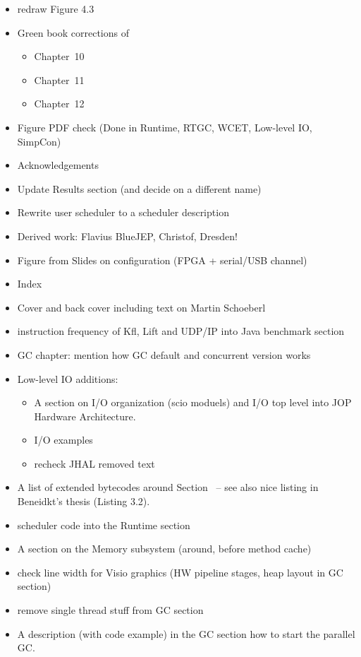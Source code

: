\begin{itemize}
    \item redraw Figure 4.3
  \item Green book corrections of
  \begin{itemize}
    \item Chapter~10
    \item Chapter~11
    \item Chapter~12
  \end{itemize}
    \item Figure PDF check (Done in Runtime, RTGC, WCET,
        Low-level IO, SimpCon)

    \item Acknowledgements
    \item Update Results section (and decide on a different name)
    \item Rewrite user scheduler to a scheduler description
    \item Derived work: Flavius BlueJEP, Christof, Dresden!
    \item Figure from Slides on configuration (FPGA + serial/USB
    channel)
    \item Index
    \item Cover and back cover including text on Martin Schoeberl
    \item instruction frequency of Kfl, Lift and UDP/IP into Java
        benchmark section
    \item GC chapter: mention how GC default and concurrent
        version works
    \item Low-level IO additions:
    \begin{itemize}
      \item A section on I/O organization (scio moduels) and
          I/O top level into JOP Hardware Architecture.
      \item I/O examples
      \item recheck JHAL removed text
    \end{itemize}
    \item A list of extended bytecodes around
        Section~\label{subsec:flex:bc} -- see also nice listing
        in Beneidkt's thesis (Listing 3.2).
    \item scheduler code into the Runtime section
    \item A section on the Memory subsystem (around, before
        method cache)
    \item check line width for Visio graphics (HW pipeline
        stages, heap layout in GC section)
    \item remove single thread stuff from GC section
    \item A description (with code example) in the GC section how
        to start the parallel GC.

\end{itemize}

